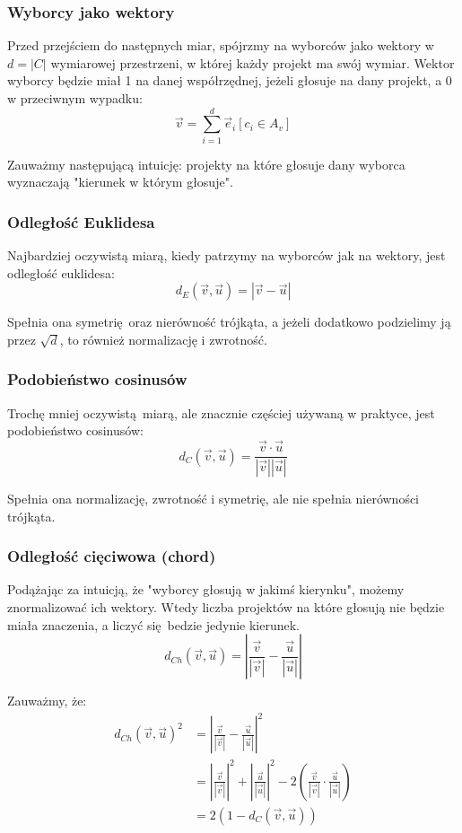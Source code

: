 \documentclass{article}
\begin{document}
\subsubsection*{Wyborcy jako wektory}

Przed przejściem do następnych miar, spójrzmy na wyborców jako wektory w
$d = |C|$ wymiarowej przestrzeni, w której każdy projekt ma swój wymiar. Wektor
wyborcy będzie miał 1 na danej współrzędnej, jeżeli głosuje na dany projekt,
a 0 w przeciwnym wypadku:
\[ \vec v = \sum_{i=1}^d \vec e_i [c_i \in A_v] \]

Zauważmy następującą intuicję: projekty na które głosuje dany wyborca
wyznaczają "kierunek w którym głosuje".

\subsubsection{Odległość Euklidesa}

Najbardziej oczywistą miarą, kiedy patrzymy na wyborców jak na wektory, jest
odległość euklidesa:
\[ d_E(\vec v, \vec u) = | \vec v - \vec u | \]

Spełnia ona symetrię oraz nierówność trójkąta, a jeżeli dodatkowo podzielimy
ją przez $\sqrt d$, to również normalizację i zwrotność.

\subsubsection{Podobieństwo cosinusów}

Trochę mniej oczywistą miarą, ale znacznie częściej używaną w praktyce, jest
podobieństwo cosinusów:
\[ d_C(\vec v, \vec u) = \frac{\vec v \cdot \vec u}{|\vec v||\vec u|} \]

Spełnia ona normalizację, zwrotność i symetrię, ale nie spełnia nierówności
trójkąta.

\subsubsection{Odległość cięciwowa (chord)}

Podążając za intuicją, że "wyborcy głosują w jakimś kierynku", możemy
znormalizować ich wektory. Wtedy liczba projektów na które głosują nie będzie
miała znaczenia, a liczyć się bedzie jedynie kierunek.
\[
  d_{Ch}(\vec v, \vec u) =
  \left|\frac{\vec v}{|\vec v|} - \frac{\vec u}{|\vec u|}\right|
\]

Zauważmy, że:
\begin{align*}
  d_{Ch}(\vec v, \vec u)^2
  &= \left|\frac{\vec v}{|\vec v|} - \frac{\vec u}{|\vec u|}\right|^2 \\
  &= \left|\frac{\vec v}{|\vec v|}\right|^2
   + \left|\frac{\vec u}{|\vec u|}\right|^2
   - 2 \left( \frac{\vec v}{|\vec v|} \cdot \frac{\vec u}{|\vec u|} \right) \\
  &= 2(1 - d_C(\vec v, \vec u))
\end{align*}
\end{document}
